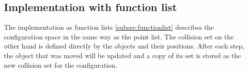%        
%        
%        
%        
%        
%        
%
%  

\subsection{Implementation with function list}
The implementation as function lists \ref{subsec:functionlist} describes the configuration space in the same way as the point list. The collision set on the other hand is defined directly by the objects and their positions. After each step, the object that was moved will be updated and a copy of its set is stored as the new collision set for the configuration.
